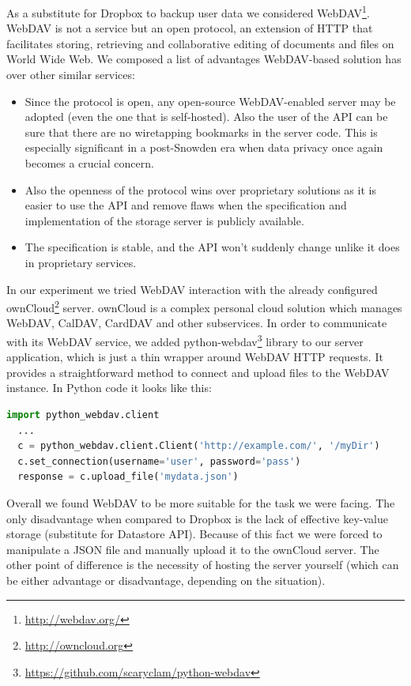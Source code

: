 \documentclass[12pt,a4paper]{article}
\begin{document}
As a substitute for Dropbox to backup user data we considered
WebDAV\footnote{\url{http://webdav.org/}}. WebDAV is not a service but
an open protocol, an extension of HTTP that facilitates storing,
retrieving and collaborative editing of documents and files on World
Wide Web. We composed a list of advantages WebDAV-based solution has
over other similar services:

\begin{itemize}
\item Since the protocol is open, any open-source WebDAV-enabled
  server may be adopted (even the one that is self-hosted). Also the
  user of the API can be sure that there are no wiretapping bookmarks
  in the server code. This is especially significant in a post-Snowden
  era when data privacy once again becomes a crucial concern.
\item Also the openness of the protocol wins over proprietary
  solutions as it is easier to use the API and remove flaws when the
  specification and implementation of the storage server is publicly
  available.
\item The specification is stable, and the API won't suddenly change
  unlike it does in proprietary services.
\end{itemize}

In our experiment we tried WebDAV interaction with the already
configured ownCloud\footnote{\url{http://owncloud.org}} server.
ownCloud is a complex personal cloud solution which manages WebDAV,
CalDAV, CardDAV and other subservices. In order to communicate with
its WebDAV service, we added
python-webdav\footnote{\url{https://github.com/scaryclam/python-webdav}}
library to our server application, which is just a thin wrapper around
WebDAV HTTP requests. It provides a straightforward method to connect
and upload files to the WebDAV instance. In Python code it looks like
this:

\begin{lstlisting}[language=Python]
  import python_webdav.client
  ...
  c = python_webdav.client.Client('http://example.com/', '/myDir')
  c.set_connection(username='user', password='pass')
  response = c.upload_file('mydata.json')
\end{lstlisting}

Overall we found WebDAV to be more suitable for the task we were
facing. The only disadvantage when compared to Dropbox is the lack of
effective key-value storage (substitute for Datastore API). Because of
this fact we were forced to manipulate a JSON file and manually upload
it to the ownCloud server. The other point of difference is the
necessity of hosting the server yourself (which can be either
advantage or disadvantage, depending on the situation).
\end{document}
